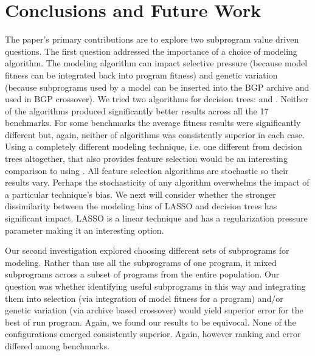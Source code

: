 \section{Conclusions and Future Work}\label{sect:conc}

The paper's primary contributions are to explore two subprogram value driven questions.  The first question addressed the importance of a choice of modeling algorithm. The modeling algorithm can impact selective pressure (because model fitness can be integrated back into program fitness) and genetic variation (because subprograms used by a model can be inserted into the BGP archive and used in BGP crossover).   We tried two algorithms for decision trees: \REPTREE and \SCIKIT. Neither of the algorithms produced significantly better results across all the 17 benchmarks.  For some benchmarks  the average fitness results were significantly different but, again, neither of algorithms was consistently superior in each case. 
Using a completely different modeling technique, i.e. one different from decision trees altogether,  that also provides feature selection would be an interesting comparison to using \REPTREE.  All feature selection algorithms are stochastic so their results vary. Perhaps the stochasticity of any algorithm overwhelms the impact of a particular technique's bias. We next will consider whether the stronger dissimilarity between the modeling bias of LASSO and decision trees has significant impact. LASSO is a linear technique and has a regularization pressure parameter making it an interesting option.


Our second investigation explored choosing different sets of subprograms for modeling. Rather than use all the subprograms of one program, it mixed subprograms across a subset of programs from the entire population. Our question was whether identifying useful subprograms in this way and integrating them into selection (via integration of model fitness for a program) and/or genetic variation (via archive based crossover) would yield superior error for the best of run program.  Again, we found our results to be equivocal.  None of the configurations emerged consistently superior. Again, however ranking and error differed among benchmarks. 

